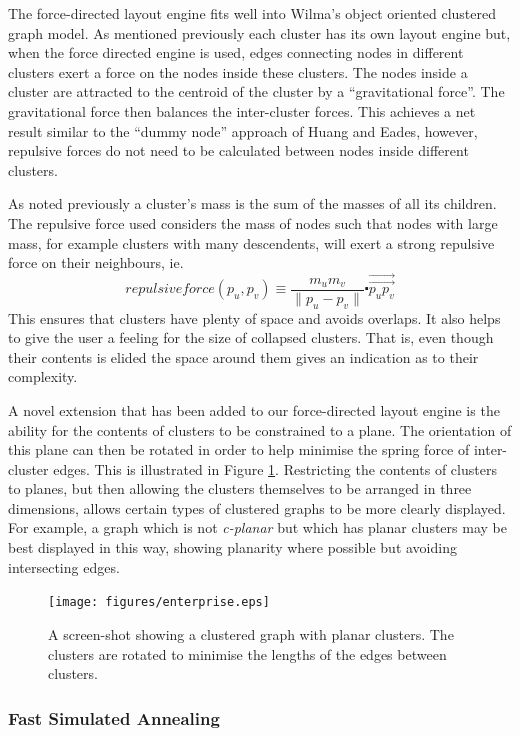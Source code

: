 \documentclass[runningheads]{cl2emult}
\newcommand{\avec}[1]{\vec{\overrightarrow{ #1}}}
\begin{document}
The force-directed layout engine fits well into Wilma's object
oriented clustered graph model.  As mentioned previously each cluster
has its own layout engine but, when the force directed engine is used,
edges connecting nodes in different clusters exert a force on
the nodes inside these clusters.  The nodes inside a cluster are
attracted to the centroid of the cluster by a ``gravitational force''.
The gravitational force then balances the inter-cluster forces.  This
achieves a net result similar to the ``dummy node'' approach of Huang
and Eades\cite{Huang:GD98}, however, repulsive forces do not need to be
calculated between nodes inside different clusters.

As noted previously a cluster's mass is the sum of the masses of all
its children.
The repulsive force used considers the mass of nodes such
that nodes with large mass, for example clusters with many descendents,
will exert a strong repulsive force on their neighbours, ie.\ 
\[ \mathit{repulsiveforce}(p_u,p_v) \equiv \frac{m_u m_v}{\|p_u-p_v\|}
\centerdot \avec{p_u p_v} \]
This ensures
that clusters have plenty of space and avoids overlaps.  It also helps
to give the user a feeling for the size of collapsed clusters.  That
is, even
though their contents is elided the space around them gives an
indication as to their complexity.

A novel extension that has been added to our force-directed layout
engine is the ability for the contents of clusters to be constrained
to a plane.  The orientation of this plane can then be rotated in
order to help minimise the spring force of inter-cluster edges.  This
is illustrated in Figure \ref{fig-spincluster}.  Restricting the
contents of clusters to planes, but then allowing the clusters
themselves to be arranged in three dimensions, allows certain types of
clustered
graphs to be more clearly displayed.  For example, a graph which is not
{\em c-planar}\cite{Eades:GD96} but which has planar clusters may be best
displayed in this way, showing planarity where possible but avoiding
intersecting edges.
\begin{figure}[h]
  \centering
    \texttt{[image: figures/enterprise.eps]}
  \caption{A screen-shot showing a clustered graph with planar
  clusters.  The clusters are rotated to minimise the lengths of the
  edges between clusters.}
  \label{fig-spincluster}
\end{figure}

\subsubsection{Fast Simulated Annealing}
\end{document}
